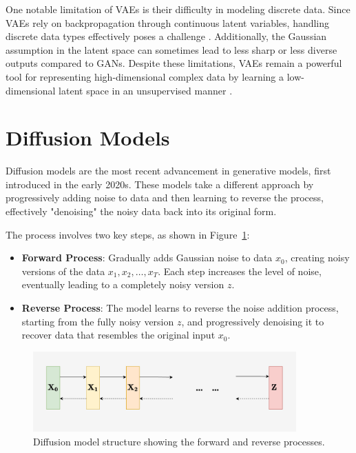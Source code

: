 One notable limitation of VAEs is their difficulty in modeling discrete data. Since VAEs rely on backpropagation through continuous latent variables, handling discrete data types effectively poses a challenge \citep{10.48550/arxiv.1909.13062}. Additionally, the Gaussian assumption in the latent space can sometimes lead to less sharp or less diverse outputs compared to GANs. Despite these limitations, VAEs remain a powerful tool for representing high-dimensional complex data by learning a low-dimensional latent space in an unsupervised manner \citep{10.48550/arxiv.2106.06500}.


\section{Diffusion Models}

Diffusion models are the most recent advancement in generative models, first introduced in the early 2020s. These models take a different approach by progressively adding noise to data and then learning to reverse the process, effectively "denoising" the noisy data back into its original form.

The process involves two key steps, as shown in Figure~\ref{fig:Diffusion_structure}:
\begin{itemize}
  \item \textbf{Forward Process}: Gradually adds Gaussian noise to data \(x_0\), creating noisy versions of the data \(x_1, x_2, \dots, x_T\). Each step increases the level of noise, eventually leading to a completely noisy version \(z\).
  \item \textbf{Reverse Process}: The model learns to reverse the noise addition process, starting from the fully noisy version \(z\), and progressively denoising it to recover data that resembles the original input \(x_0\).
\end{itemize}

\begin{figure}[]
    \centering
    \includegraphics[width=0.9\textwidth]{./Images/Diffusion_structure.jpg}
    \caption{Diffusion model structure showing the forward and reverse processes.}
    \label{fig:Diffusion_structure}
\end{figure}

